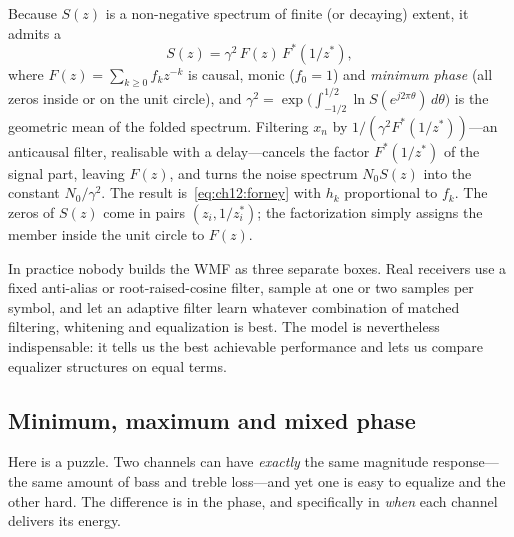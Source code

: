 \begin{deeper}
Because $S(z)$ is a non-negative spectrum of finite (or decaying) extent, it admits a
\begin{equation}
S(z)=\gamma^2\,F(z)\,F^*(1/z^*),
\label{eq:ch12:specfact}
\end{equation}
where $F(z)=\sum_{k\ge0}f_kz^{-k}$ is causal, monic ($f_0=1$) and \emph{minimum phase} (all zeros
inside or on the unit circle), and
$\gamma^2=\exp\!\big(\int_{-1/2}^{1/2}\ln S(e^{j2\pi\theta})\,d\theta\big)$ is the geometric mean of
the folded spectrum. Filtering $x_n$ by $1/(\gamma^2F^*(1/z^*))$---an anticausal filter, realisable
with a delay---cancels the factor $F^*(1/z^*)$ of the signal part, leaving $F(z)$, and turns the
noise spectrum $N_0S(z)$ into the constant $N_0/\gamma^2$. The result is~\eqref{eq:ch12:forney}
with $h_k$ proportional to $f_k$. The zeros of $S(z)$ come in pairs $(z_i,1/z_i^*)$; the
factorization simply assigns the member inside the unit circle to $F(z)$.
\end{deeper}

In practice nobody builds the WMF as three separate boxes. Real receivers use a fixed
anti-alias or root-raised-cosine filter, sample at one or two samples per symbol, and let an
adaptive filter learn whatever combination of matched filtering, whitening and equalization is
best. The model is nevertheless indispensable: it tells us the best achievable performance and
lets us compare equalizer structures on equal terms.


\subsection{Minimum, maximum and mixed phase}

Here is a puzzle. Two channels can have \emph{exactly} the same magnitude response---the same
amount of bass and treble loss---and yet one is easy to equalize and the other hard. The
difference is in the phase, and specifically in \emph{when} each channel delivers its energy.

